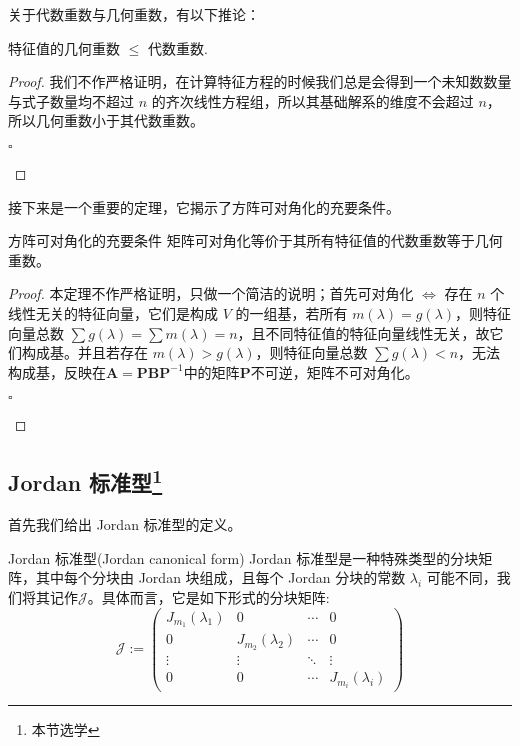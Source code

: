 关于代数重数与几何重数，有以下推论：

\begin{corollary}
	特征值的几何重数 $\leq$ 代数重数.
\end{corollary}

\begin{proof}
	我们不作严格证明，在计算特征方程的时候我们总是会得到一个未知数数量与式子数量均不超过 $n$ 的齐次线性方程组，所以其基础解系的维度不会超过 $n$，所以几何重数小于其代数重数。
	\begin{flushright}
		$\square$
	\end{flushright}
\end{proof}

接下来是一个重要的定理，它揭示了方阵可对角化的充要条件。

\begin{theorem}{方阵可对角化的充要条件}
	\label{the:candiag}
	矩阵可对角化等价于其所有特征值的代数重数等于几何重数。
\end{theorem}

\begin{proof}
	本定理不作严格证明，只做一个简洁的说明；首先可对角化 $\iff$ 存在 $n$ 个线性无关的特征向量，它们是构成 $V$ 的一组基，若所有 $m(\lambda) = g(\lambda)$，则特征向量总数 $\sum g(\lambda) = \sum m(\lambda) = n$，且不同特征值的特征向量线性无关，故它们构成基。并且若存在 $m(\lambda) > g(\lambda)$，则特征向量总数 $\sum g(\lambda) < n$，无法构成基，反映在$\mathbf{A}=\mathbf{P}\mathbf{B}\mathbf{P}^{-1}$中的矩阵$\mathbf{P}$不可逆，矩阵不可对角化。
	\begin{flushright}
		$\square$
	\end{flushright}
\end{proof}

\subsection{Jordan 标准型\footnote{本节选学}}

首先我们给出 Jordan 标准型的定义。

\begin{definition}{Jordan 标准型(Jordan canonical form)}
	Jordan 标准型是一种特殊类型的分块矩阵，其中每个分块由 Jordan 块组成，且每个 Jordan 分块的常数 $\lambda_i$ 可能不同，我们将其记作$\mathscr{J}$。具体而言，它是如下形式的分块矩阵:
	$$\mathscr{J}:=\begin{pmatrix}
		J_{m_1}(\lambda_1) & 0 & \cdots & 0\\
		0 & J_{m_2}(\lambda_2) & \cdots &0 \\
		\vdots & \vdots & \ddots & \vdots\\
		0 & 0 & \cdots &J_{m_i}(\lambda_i)
		\end{pmatrix}$$
\end{definition}

